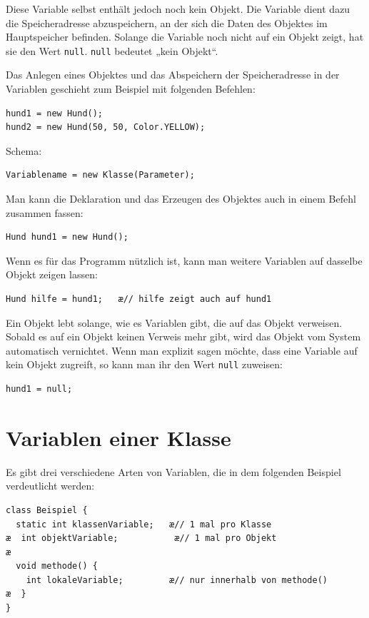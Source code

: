 Diese Variable selbst enthält jedoch noch kein Objekt. Die Variable dient dazu
die Speicheradresse abzuspeichern, an der sich die Daten des Objektes im
Hauptspeicher befinden. Solange die Variable noch nicht auf ein Objekt zeigt,
hat sie den Wert \lstinline|null|. \lstinline|null| bedeutet „kein Objekt“.

Das Anlegen eines Objektes und das Abspeichern der Speicheradresse in der
Variablen geschieht zum Beispiel mit folgenden Befehlen:

\begin{lstlisting}
hund1 = new Hund();
hund2 = new Hund(50, 50, Color.YELLOW);
\end{lstlisting}

Schema:

\begin{lstlisting}
Variablename = new Klasse(Parameter);
\end{lstlisting}

Man kann die Deklaration und das Erzeugen des Objektes auch in einem Befehl
zusammen fassen:

\begin{lstlisting}
Hund hund1 = new Hund();
\end{lstlisting}

Wenn es für das Programm nützlich ist, kann man weitere Variablen auf dasselbe
Objekt zeigen lassen:

\begin{lstlisting}
Hund hilfe = hund1;   æ// hilfe zeigt auch auf hund1
\end{lstlisting}

Ein Objekt lebt solange, wie es Variablen gibt, die auf das Objekt verweisen.
Sobald es auf ein Objekt keinen Verweis mehr gibt, wird das Objekt vom System
automatisch vernichtet. Wenn man explizit sagen möchte, dass eine Variable auf
kein Objekt zugreift, so kann man ihr den Wert \lstinline|null| zuweisen:

\begin{lstlisting}
hund1 = null;
\end{lstlisting}


\section{Variablen einer Klasse}

Es gibt drei verschiedene Arten von Variablen, die in dem folgenden Beispiel
verdeutlicht werden:

\begin{lstlisting}
class Beispiel {
  static int klassenVariable;   æ// 1 mal pro Klasse
æ  int objektVariable;           æ// 1 mal pro Objekt
æ
  void methode() {
    int lokaleVariable;         æ// nur innerhalb von methode()
æ  }
}
\end{lstlisting}

